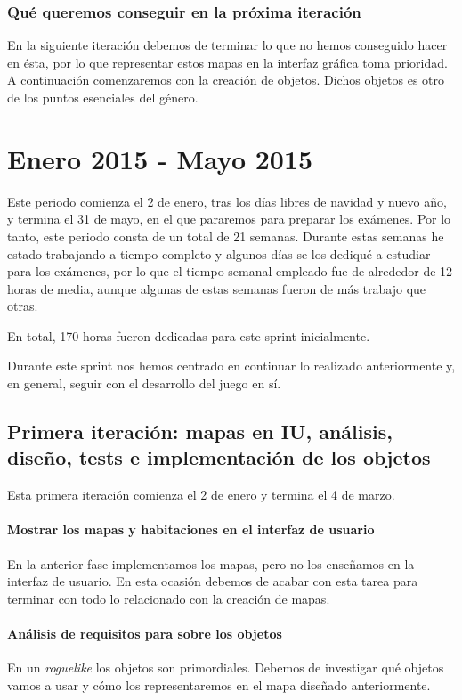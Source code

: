 \subsubsection{Qué queremos conseguir en la próxima iteración}

En la siguiente iteración debemos de terminar lo que no hemos conseguido hacer en ésta, por lo que representar estos mapas en la interfaz gráfica toma prioridad. A continuación comenzaremos con la creación de objetos. Dichos objetos es otro de los puntos esenciales del género.

\section{Enero 2015 - Mayo 2015}

Este periodo comienza el 2 de enero, tras los días libres de navidad y nuevo año, y termina el 31 de mayo, en el que pararemos para preparar los exámenes. Por lo tanto, este periodo consta de un total de 21 semanas. Durante estas semanas he estado trabajando a tiempo completo y algunos días se los dediqué a estudiar para los exámenes, por lo que el tiempo semanal empleado fue de alrededor de 12 horas de media, aunque algunas de estas semanas fueron de más trabajo que otras.

En total, 170 horas fueron dedicadas para este sprint inicialmente.

Durante este sprint nos hemos centrado en continuar lo realizado anteriormente y, en general, seguir con el desarrollo del juego en sí.

\subsection{Primera iteración: mapas en IU, análisis, diseño, tests e implementación de los objetos}

Esta primera iteración comienza el 2 de enero y termina el 4 de marzo.

\paragraph{Mostrar los mapas y habitaciones en el interfaz de usuario} En la anterior fase implementamos los mapas, pero no los enseñamos en la interfaz de usuario. En esta ocasión debemos de acabar con esta tarea para terminar con todo lo relacionado con la creación de mapas.

\paragraph{Análisis de requisitos para sobre los objetos} En un \textit{roguelike} los objetos son primordiales. Debemos de investigar qué objetos vamos a usar y cómo los representaremos en el mapa diseñado anteriormente.

